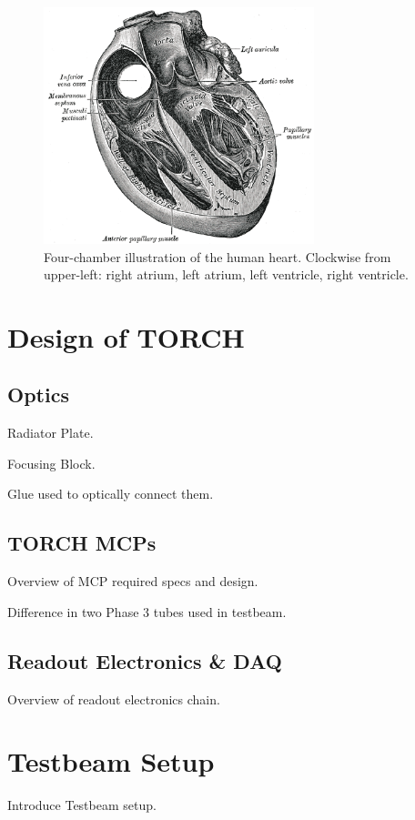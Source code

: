 \begin{figure}
\centering\includegraphics[width=0.7\textwidth]{figures/sample/Gray498.png} 
\caption[Four-chamber illustration of the human heart.]{Four-chamber illustration of the human heart.  Clockwise from upper-left: right atrium, left atrium, left ventricle, right ventricle.}
\label{fig:FocusingBlock}\end{figure}

\section{Design of TORCH}

\subsection{Optics}
Radiator Plate.

Focusing Block.

Glue used to optically connect them.

\subsection{TORCH MCPs}
Overview of MCP required specs and design.

Difference in two Phase 3 tubes used in testbeam.

\subsection{Readout Electronics \& DAQ}
Overview of readout electronics chain.

\section{Testbeam Setup}
Introduce Testbeam setup.

